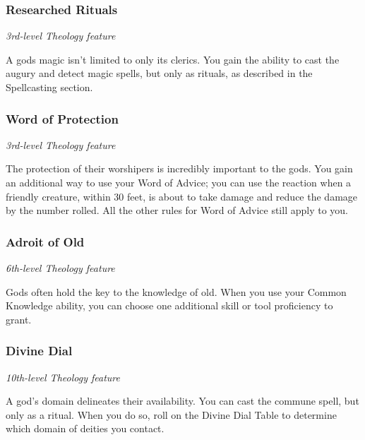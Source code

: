 \documentclass[letterpaper,openany,twoside,twocolumn]{book}
\begin{document}
	\subsubsection*{Researched Rituals}
	\textnormal{\textit{3rd-level Theology feature}}
	
	A gods magic isn't limited to only its clerics. You gain the ability to cast the augury and detect magic spells, but only as rituals, as described in the Spellcasting section.
	
	\subsubsection*{Word of Protection}
	\textnormal{\textit{3rd-level Theology feature}}
	
	The protection of their worshipers is incredibly important to the gods. You gain an additional way to use your Word of Advice; you can use the reaction when a friendly creature, within 30 feet, is about to take damage and reduce the damage by the number rolled. All the other rules for Word of Advice still apply to you.
	
	\subsubsection*{Adroit of Old}
	\textnormal{\textit{6th-level Theology feature}}
	
	Gods often hold the key to the knowledge of old. When you use your Common Knowledge ability, you can choose one additional skill or tool proficiency to grant.
	
	\subsubsection*{Divine Dial}
	\textnormal{\textit{10th-level Theology feature}}
	
	A god's domain delineates their availability. You can cast the commune spell, but only as a ritual. When you do so, roll on the Divine Dial Table to determine which domain of deities you contact.
	
\end{document}
